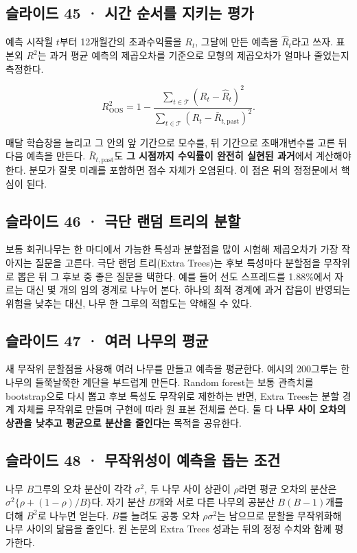 \documentclass[11pt,a4paper]{article}
\begin{document}
\subsection{슬라이드 45 · 시간 순서를 지키는 평가}
예측 시작월 $t$부터 12개월간의 초과수익률을 $R_t$, 그달에 만든 예측을 $\hat R_t$라고 쓰자. 표본외 $R^2$는 과거 평균 예측의 제곱오차를 기준으로 모형의 제곱오차가 얼마나 줄었는지 측정한다.\par

\[
R^2_{\mathrm{OOS}}=1-
\frac{\sum_{t\in\mathcal T}(R_t-\hat R_t)^2}
{\sum_{t\in\mathcal T}(R_t-\bar R_{t,\mathrm{past}})^2}.
\]

매달 학습창을 늘리고 그 안의 앞 기간으로 모수를, 뒤 기간으로 초매개변수를 고른 뒤 다음 예측을 만든다. $\bar R_{t,\mathrm{past}}$도 \textbf{그 시점까지 수익률이 완전히 실현된 과거}에서 계산해야 한다. 분모가 잘못 미래를 포함하면 점수 자체가 오염된다. 이 점은 뒤의 정정문에서 핵심이 된다.\par

\subsection{슬라이드 46 · 극단 랜덤 트리의 분할}
보통 회귀나무는 한 마디에서 가능한 특성과 분할점을 많이 시험해 제곱오차가 가장 작아지는 질문을 고른다. 극단 랜덤 트리(Extra Trees)는 후보 특성마다 분할점을 무작위로 뽑은 뒤 그 후보 중 좋은 질문을 택한다. 예를 들어 선도 스프레드를 1.88\%에서 자르는 대신 몇 개의 임의 경계로 나누어 본다. 하나의 최적 경계에 과거 잡음이 반영되는 위험을 낮추는 대신, 나무 한 그루의 적합도는 약해질 수 있다.\par

\subsection{슬라이드 47 · 여러 나무의 평균}
새 무작위 분할점을 사용해 여러 나무를 만들고 예측을 평균한다. 예시의 200그루는 한 나무의 들쭉날쭉한 계단을 부드럽게 만든다. Random forest는 보통 관측치를 bootstrap으로 다시 뽑고 후보 특성도 무작위로 제한하는 반면, Extra Trees는 분할 경계 자체를 무작위로 만들며 구현에 따라 원 표본 전체를 쓴다. 둘 다 \textbf{나무 사이 오차의 상관을 낮추고 평균으로 분산을 줄인다}는 목적을 공유한다.\par

\subsection{슬라이드 48 · 무작위성이 예측을 돕는 조건}
나무 $B$그루의 오차 분산이 각각 $\sigma^2$, 두 나무 사이 상관이 $\rho$라면 평균 오차의 분산은 $\sigma^2\{\rho+(1-\rho)/B\}$다. 자기 분산 $B$개와 서로 다른 나무의 공분산 $B(B-1)$개를 더해 $B^2$로 나누면 얻는다. $B$를 늘려도 공통 오차 $\rho\sigma^2$는 남으므로 분할을 무작위화해 나무 사이의 닮음을 줄인다. 원 논문의 Extra Trees 성과는 뒤의 정정 수치와 함께 평가한다.\par
\end{document}
